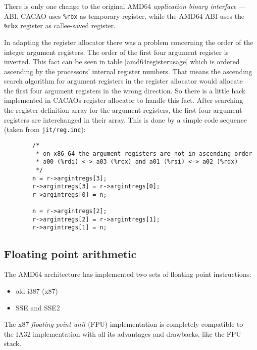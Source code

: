 There is only one change to the original AMD64 \textit{application
binary interface} --- ABI. CACAO uses \texttt{\%rbx} as temporary
register, while the AMD64 ABI uses the \texttt{\%rbx} register as
callee-saved register.

In adapting the register allocator there was a problem concerning the
order of the integer argument registers. The order of the first four
argument register is inverted. This fact can be seen in table
\ref{amd64registerusage} which is ordered ascending by the processors'
internal register numbers. That means the ascending search algorithm
for argument registers in the register allocator would allocate the
first four argument registers in the wrong direction. So there is a
little hack implemented in CACAOs register allocator to handle this
fact. After searching the register definition array for the argument
registers, the first four argument registers are interchanged in their
array. This is done by a simple code sequence (taken from
\texttt{jit/reg.inc}):

\begin{verbatim}
        /* 
         * on x86_64 the argument registers are not in ascending order 
         * a00 (%rdi) <-> a03 (%rcx) and a01 (%rsi) <-> a02 (%rdx)
         */
        n = r->argintregs[3];
        r->argintregs[3] = r->argintregs[0];
        r->argintregs[0] = n;

        n = r->argintregs[2];
        r->argintregs[2] = r->argintregs[1];
        r->argintregs[1] = n;
\end{verbatim}


\subsection{Floating point arithmetic}

The AMD64 architecture has implemented two sets of floating point instructions:

\begin{itemize}
\item old i387 (x87)
\item SSE and SSE2
\end{itemize}

The x87 \textit{floating point unit} (FPU) implementation is
completely compatible to the IA32 implementation with all its
advantages and drawbacks, like the FPU stack.
